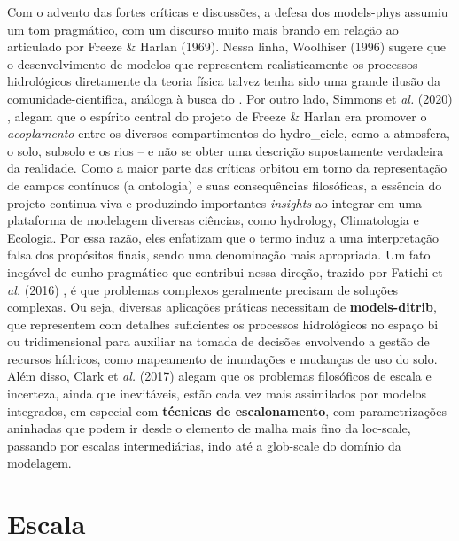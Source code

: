 \documentclass[./main.tex]{subfiles}
\begin{document}
\par Com o advento das fortes críticas e discussões, a defesa dos \gls{models-phys} assumiu um tom pragmático, com um discurso muito mais brando em relação ao articulado por Freeze \& Harlan (1969). Nessa linha, Woolhiser (1996) \cite{Woolhiser1996a} sugere que o desenvolvimento de modelos que representem realisticamente os processos hidrológicos diretamente da \gls{teoria} física talvez tenha sido uma grande ilusão da \gls{comunidade-cientifica}, análoga à busca do . Por outro lado, Simmons et \textit{al.} (2020) \cite{Simmons2020a}, alegam que o espírito central do projeto de Freeze \& Harlan era promover o \textit{acoplamento} entre os diversos compartimentos do \gls{hydro_cicle}, como a atmosfera, o solo, subsolo e os rios -- e não se obter uma descrição supostamente verdadeira da realidade. Como a maior parte das críticas orbitou em torno da representação de campos contínuos (a ontologia) e suas consequências filosóficas, a essência do projeto continua viva e produzindo importantes \textit{insights} ao integrar em uma plataforma de modelagem diversas ciências, como \gls{hydrology}, Climatologia e Ecologia. Por essa razão, eles enfatizam que o termo  induz a uma interpretação falsa dos propósitos finais, sendo  uma denominação mais apropriada. Um fato inegável de cunho pragmático que contribui nessa direção, trazido por Fatichi et \textit{al.} (2016) \cite{Fatichi2016a}, é que problemas complexos geralmente precisam de soluções complexas. Ou seja, diversas aplicações práticas necessitam de \textbf{\gls{models-ditrib}}, que representem com detalhes suficientes os processos hidrológicos no espaço bi ou tridimensional para auxiliar na tomada de decisões envolvendo a gestão de recursos hídricos, como mapeamento de inundações e mudanças de uso do solo. Além disso, Clark et \textit{al.} (2017) \cite{Clark2017a} alegam que os problemas filosóficos de escala e incerteza, ainda que inevitáveis, estão cada vez mais assimilados por modelos integrados, em especial com \textbf{técnicas de escalonamento}, com parametrizações aninhadas que podem ir desde o elemento de malha mais fino da \gls{loc-scale}, passando por escalas intermediárias, indo até a \gls{glob-scale} do domínio da modelagem.
 
\section{Escala} \label{sec:hydro:sim}
\end{document}

